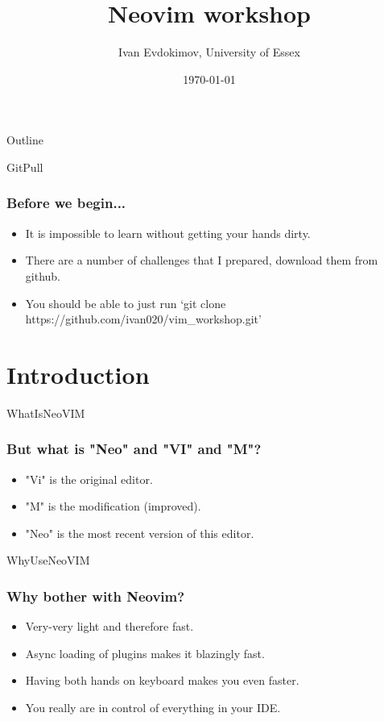 \documentclass{beamer}
\title{Neovim workshop}
\author{Ivan Evdokimov, University of Essex}
\date{\today}
\begin{document}
\begin{frame}
    \titlepage
\end{frame}

\begin{frame}{Outline}
    \begingroup
    \tableofcontents
    \endgroup
\end{frame}

\begin{frame}{GitPull}
    \frametitle{Before we begin...}
    \begin{itemize}
        \item It is impossible to learn without getting your hands dirty.
        \item There are a number of challenges that I prepared, download them from github.
        \item You should be able to just run `git clone https://github.com/ivan020/vim\_workshop.git'
    \end{itemize}
\end{frame}


\section{Introduction}
\begin{frame}{WhatIsNeoVIM}
    \frametitle{But what is "Neo" and "VI" and "M"?}
    \begin{itemize}
        \item "Vi" is the original editor.
        \item "M" is the modification (improved).
        \item "Neo" is the most recent version of this editor.
    \end{itemize}
\end{frame}

\begin{frame}{WhyUseNeoVIM}
    \frametitle{Why bother with Neovim?}
    \begin{itemize}
        \item Very-very light and therefore fast.
        \item Async loading of plugins makes it blazingly fast.
        \item Having both hands on keyboard makes you even faster.
        \item You really are in control of everything in your IDE.
    \end{itemize}
\end{frame}
\end{document}

